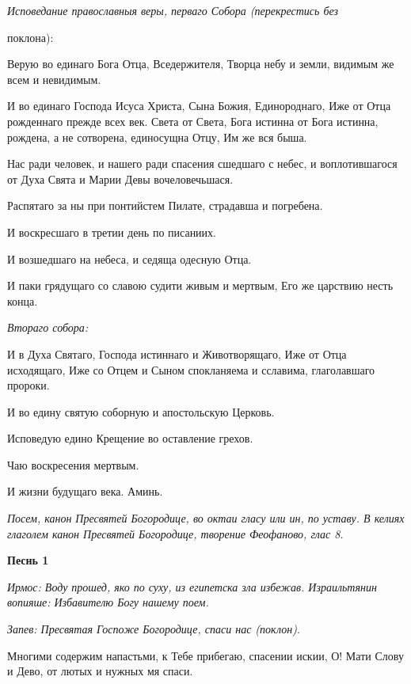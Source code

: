  \itshape Исповедание православныя веры, перваго Собора (перекрестись без

поклона)\normalfont{}:


   Верую во единаго Бога Отца, Вседержителя, Творца небу и земли,
видимым же всем и невидимым.


   И во единаго Господа Исуса Христа, Сына Божия, Единороднаго, Иже от
Отца рожденнаго прежде всех век. Света от Света, Бога истинна от
Бога истинна, рождена, а не сотворена, единосущна Отцу, Им же вся
быша.


   Нас ради человек, и нашего ради спасения сшедшаго с небес, и
воплотившагося от Духа Свята и Марии Девы вочеловечьшася.


   Распятаго за ны при понтийстем Пилате, страдавша и погребена.


   И воскресшаго в третии день по писаниих.


   И возшедшаго на небеса, и седяща одесную Отца.


   И паки грядущаго со славою судити живым и мертвым, Его же царствию
несть конца.


 \itshape Втораго собора:\normalfont{}


   И в Духа Святаго, Господа истиннаго и Животворящаго, Иже от Отца
исходящаго, Иже со Отцем и Сыном спокланяема и сславима, глаголавшаго
пророки.


   И во едину святую соборную и апостольскую Церковь.


   Исповедую едино Крещение во оставление грехов.


   Чаю воскресения мертвым.


   И жизни будущаго века. Аминь.


 \itshape Посем, канон Пресвятей Богородице, во октаи гласу или ин, по уставу. В
келиях глаголем канон Пресвятей Богородице, творение Феофаново, глас
8.\normalfont{}






 

\bfseries Песнь 1\normalfont{}


 \itshape Ирмос:\normalfont{} Воду прошед, яко по суху, из египетска зла избежав. Израильтянин
вопияше: Избавителю Богу нашему поем.


 \itshape Запев:\normalfont{} Пресвятая Госпоже Богородице, спаси нас \itshape (поклон)\normalfont{}.


   Многими содержим напастьми, к Тебе прибегаю, спасении искии, О!
Мати Слову и Дево, от лютых и нужных мя спаси.


